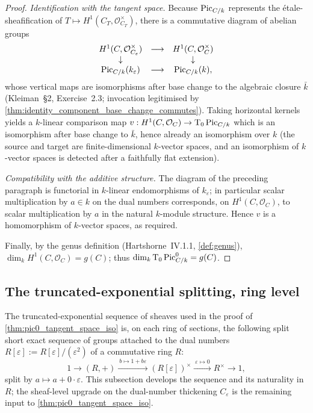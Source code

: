 \begin{proof}
  \emph{Identification with the tangent space.} Because \(\operatorname{Pic}_{C/k}\)
  represents the étale-sheafification of
  \(T \mapsto H^1(C_T, \mathcal{O}_{C_T}^{\times})\), there is a
  commutative diagram of abelian groups
  \[
    \begin{array}{ccc}
      H^1(C, \mathcal{O}_{C_\varepsilon}^{\times}) &
        \longrightarrow & H^1(C, \mathcal{O}_C^{\times}) \\
      \downarrow & & \downarrow \\
      \operatorname{Pic}_{C/k}(k_\varepsilon) & \longrightarrow &
        \operatorname{Pic}_{C/k}(k),
    \end{array}
  \]
  whose vertical maps are isomorphisms after base change to the
  algebraic closure \(\bar k\) (Kleiman~\S 2, Exercise~2.3;
  invocation legitimised by
  \cref{thm:identity_component_base_change_commutes}). Taking horizontal
  kernels yields a \(k\)-linear comparison map
  \(v : H^1(C, \mathcal{O}_C) \to \textup T_0 \operatorname{Pic}_{C/k}\) which is an
  isomorphism after base change to \(\bar k\), hence already an
  isomorphism over \(k\) (the source and target are finite-dimensional
  \(k\)-vector spaces, and an isomorphism of \(k\)-vector spaces is
  detected after a faithfully flat extension).

  \emph{Compatibility with the additive structure.} The diagram of the
  preceding paragraph is functorial in \(k\)-linear endomorphisms of
  \(k_\varepsilon\); in particular scalar multiplication by \(a \in
  k\) on the dual numbers corresponds, on
  \(H^1(C, \mathcal{O}_C)\), to scalar multiplication by \(a\) in the
  natural \(k\)-module structure. Hence \(v\) is a homomorphism of
  \(k\)-vector spaces, as required.

  Finally, by the genus definition (Hartshorne~IV.1.1,
  \cref{def:genus}), \(\dim_k H^1(C, \mathcal{O}_C) = g(C)\); thus
  \(\dim_k \textup T_0 \operatorname{Pic}^0_{C/k} = g(C)\).
\end{proof}

\subsection{The truncated-exponential splitting, ring level}
\label{sec:pic0_trunc_exp}

The truncated-exponential sequence of sheaves used in the proof of
\cref{thm:pic0_tangent_space_iso} is, on each ring of sections, the
following split short exact sequence of groups attached to the dual
numbers \(R[\varepsilon] := R[\varepsilon]/(\varepsilon^2)\) of a
commutative ring \(R\):
\[
  1 \longrightarrow (R, +)
    \xrightarrow{\ b \mapsto 1 + b\varepsilon\ }
    (R[\varepsilon])^{\times}
    \xrightarrow{\ \varepsilon \mapsto 0\ }
    R^{\times} \longrightarrow 1,
\]
split by \(a \mapsto a + 0\cdot\varepsilon\). This subsection develops
the sequence and its naturality in \(R\); the sheaf-level upgrade on the
dual-number thickening \(C_\varepsilon\) is the remaining input to
\cref{thm:pic0_tangent_space_iso}.

